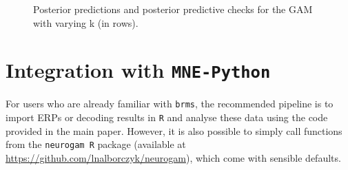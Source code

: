 \documentclass[
  doc,
  floatsintext,
  longtable,
  a4paper,
  nolmodern,
  notxfonts,
  notimes,
  colorlinks=true,linkcolor=blue,citecolor=blue,urlcolor=blue]{apa7}
\begin{document}
\begin{figure}[!htb]

\caption{\label{fig-choose-k}Posterior predictions and posterior
predictive checks for the GAM with varying k (in rows).}


\end{figure}%

\newpage

\section{\texorpdfstring{Integration with
\texttt{MNE-Python}}{Integration with MNE-Python}}\label{integration-with-mne-python}

For users who are already familiar with \texttt{brms}, the recommended
pipeline is to import ERPs or decoding results in \texttt{R} and analyse
these data using the code provided in the main paper. However, it is
also possible to simply call functions from the \texttt{neurogam\ R}
package (available at \url{https://github.com/lnalborczyk/neurogam}),
which come with sensible defaults.
\end{document}
